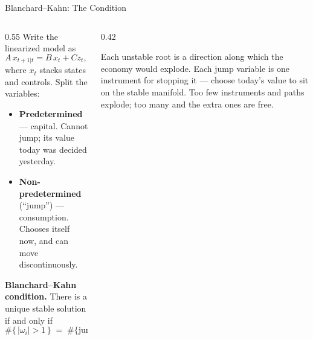 \begin{frame}{Blanchard--Kahn: The Condition}
\begin{columns}[T]
\begin{column}{0.55\textwidth}
\small
Write the linearized model as
\[
  A\,x_{t+1|t} = B\,x_t + C z_t,
  \qquad z_{t+1}=\rho z_t+\varepsilon_{t+1},
\]
where $x_t$ stacks states and controls. Split the variables:
\medskip
\begin{itemize}\small
  \item \textbf{Predetermined} --- capital. Cannot jump; its value today was decided yesterday.
  \item \textbf{Non-predetermined} (``jump'') --- consumption. Chooses itself now, and can move discontinuously.
\end{itemize}
\medskip
\textbf{Blanchard--Kahn condition.} There is a unique stable solution if and only if
\[
  \#\{\,|\omega_i|>1\,\} \;=\; \#\{\text{jump variables}\} .
\]
\end{column}
\begin{column}{0.42\textwidth}
\begin{conceptbox}[title=\textbf{The intuition}]\small
Each unstable root is a direction along which the economy would explode. Each jump variable is one instrument for stopping it --- choose today's value to sit on the stable manifold.
\medskip
Too few instruments and paths explode; too many and the extra ones are free.
\end{conceptbox}
\end{column}
\end{columns}
\vspace{1mm}
\end{frame}

